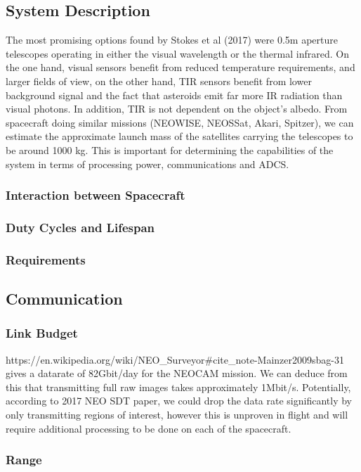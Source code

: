 \documentclass[a4paper,10pt]{article}
\begin{document}
\subsection{System Description}
The most promising options found by Stokes et al (2017) were 0.5m aperture telescopes operating in either the visual wavelength or the thermal infrared. On the one hand, visual sensors benefit from reduced temperature requirements, and larger fields of view, on the other hand, TIR sensors benefit from lower background signal and the fact that asteroids emit far more IR radiation than visual photons. In addition, TIR is not dependent on the object's albedo. From spacecraft doing similar missions (NEOWISE, NEOSSat, Akari, Spitzer), we can estimate the approximate launch mass of the satellites carrying the telescopes to be around 1000 kg. This is important for determining the capabilities of the system in terms of processing power, communications and ADCS. 
\subsubsection{Interaction between Spacecraft}

\subsubsection{Duty Cycles and Lifespan}

\subsubsection{Requirements}


\subsection{Communication}
\subsubsection{Link Budget}
https://en.wikipedia.org/wiki/NEO_Surveyor#cite_note-Mainzer2009sbag-31 gives a datarate of 82Gbit/day for the NEOCAM mission. We can deduce from this that transmitting full raw images takes approximately 1Mbit/s. Potentially, according to 2017 NEO SDT paper, we could drop the data rate significantly by only transmitting regions of interest, however this is unproven in flight and will require additional processing to be done on each of the spacecraft.
\subsubsection{Range}
\end{document}
